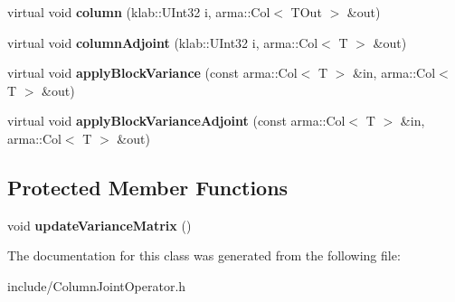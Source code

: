 \begin{DoxyCompactItemize}
\item 
virtual void {\bfseries column} (klab\+::\+U\+Int32 i, arma\+::\+Col$<$ T\+Out $>$ \&out)\hypertarget{classkl1p_1_1TColumnJointOperator_a99ac91ff87f6985a9f0f3d6300d54fc4}{}\label{classkl1p_1_1TColumnJointOperator_a99ac91ff87f6985a9f0f3d6300d54fc4}

\item 
virtual void {\bfseries column\+Adjoint} (klab\+::\+U\+Int32 i, arma\+::\+Col$<$ T $>$ \&out)\hypertarget{classkl1p_1_1TColumnJointOperator_a119944332beae5d5005ec2ea872a8d11}{}\label{classkl1p_1_1TColumnJointOperator_a119944332beae5d5005ec2ea872a8d11}

\item 
virtual void {\bfseries apply\+Block\+Variance} (const arma\+::\+Col$<$ T $>$ \&in, arma\+::\+Col$<$ T $>$ \&out)\hypertarget{classkl1p_1_1TColumnJointOperator_a6ba8fc8dd7718501b1bf85dc98e1906c}{}\label{classkl1p_1_1TColumnJointOperator_a6ba8fc8dd7718501b1bf85dc98e1906c}

\item 
virtual void {\bfseries apply\+Block\+Variance\+Adjoint} (const arma\+::\+Col$<$ T $>$ \&in, arma\+::\+Col$<$ T $>$ \&out)\hypertarget{classkl1p_1_1TColumnJointOperator_a7c20b44637b82a4899a7a949ce931adc}{}\label{classkl1p_1_1TColumnJointOperator_a7c20b44637b82a4899a7a949ce931adc}

\end{DoxyCompactItemize}
\subsection*{Protected Member Functions}
\begin{DoxyCompactItemize}
\item 
void {\bfseries update\+Variance\+Matrix} ()\hypertarget{classkl1p_1_1TColumnJointOperator_a7e3d933b298daeb775fd120f712eff28}{}\label{classkl1p_1_1TColumnJointOperator_a7e3d933b298daeb775fd120f712eff28}

\end{DoxyCompactItemize}


The documentation for this class was generated from the following file\+:\begin{DoxyCompactItemize}
\item 
include/Column\+Joint\+Operator.\+h\end{DoxyCompactItemize}

